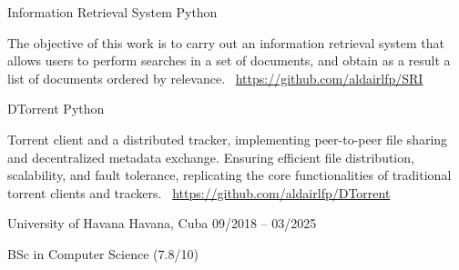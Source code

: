 \documentclass[]{awesome-cv}
\begin{document}
\begin{cventries}
	\vspace{-3mm}
	\cventry
	{}
	{Information Retrieval System \vspace{-5mm}}
	{Python \vspace{-5mm}}
	{}
	{\begin{cvsectionnormaltext}
			\item{The objective of this work is to carry out an information retrieval system that allows users to perform searches in a set
of documents, and obtain as a result a list of documents ordered by relevance.
			            \newline \faLink\ \href{https://github.com/aldairlfp/SRI}{https://github.com/aldairlfp/SRI}}
		\end{cvsectionnormaltext}}
	
	\vspace{-3mm}
	\cventry
	{}
	{DTorrent \vspace{-5mm}}
	{Python \vspace{-5mm}}
	{}
	{\begin{cvsectionnormaltext}
			\item{Torrent client and a distributed tracker, implementing peer-to-peer file sharing and decentralized metadata exchange.
Ensuring efficient file distribution, scalability, and fault tolerance, replicating the core functionalities of traditional
torrent clients and trackers.
			            \newline \faLink\ \href{https://github.com/aldairlfp/DTorrent}{https://github.com/aldairlfp/DTorrent}}
		\end{cvsectionnormaltext}}

	\vspace{-5mm}

\end{cventries}

\vspace{8mm}
\begin{cventries}
	\vspace{-3mm}
	\cventry
	{}
	{University of Havana \vspace{-5mm}}
	{Havana, Cuba \vspace{-5mm}}
	{09/2018 – 03/2025 \vspace{-5mm}}
	{\begin{cvsectionnormaltext}
			\item{BSc in Computer Science (7.8/10)}
		\end{cvsectionnormaltext}}
\end{cventries}
\end{document}
